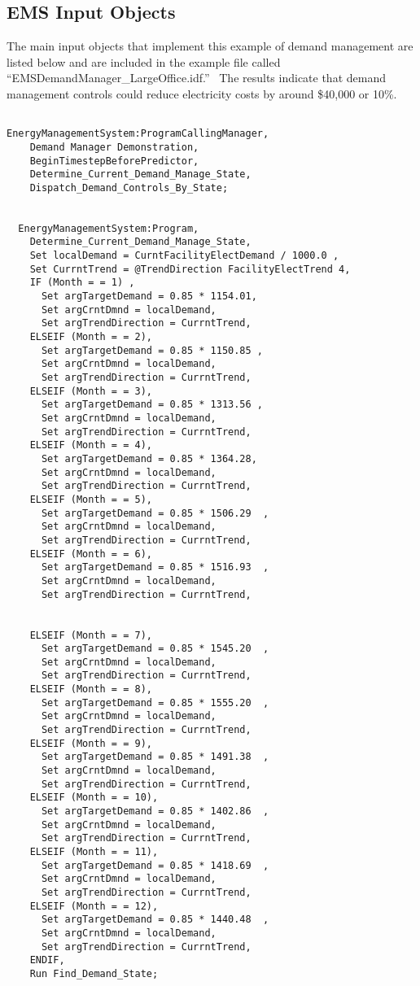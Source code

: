 \subsection{EMS Input Objects}\label{ems-input-objects-011}

The main input objects that implement this example of demand management are listed below and are included in the example file called ``EMSDemandManager\_LargeOffice.idf.''~ The results indicate that demand management controls could reduce electricity costs by around \$40,000 or 10\%.

\begin{lstlisting}

EnergyManagementSystem:ProgramCallingManager,
    Demand Manager Demonstration,
    BeginTimestepBeforePredictor,
    Determine_Current_Demand_Manage_State,
    Dispatch_Demand_Controls_By_State;


  EnergyManagementSystem:Program,
    Determine_Current_Demand_Manage_State,
    Set localDemand = CurntFacilityElectDemand / 1000.0 ,
    Set CurrntTrend = @TrendDirection FacilityElectTrend 4,
    IF (Month = = 1) ,
      Set argTargetDemand = 0.85 * 1154.01,
      Set argCrntDmnd = localDemand,
      Set argTrendDirection = CurrntTrend,
    ELSEIF (Month = = 2),
      Set argTargetDemand = 0.85 * 1150.85 ,
      Set argCrntDmnd = localDemand,
      Set argTrendDirection = CurrntTrend,
    ELSEIF (Month = = 3),
      Set argTargetDemand = 0.85 * 1313.56 ,
      Set argCrntDmnd = localDemand,
      Set argTrendDirection = CurrntTrend,
    ELSEIF (Month = = 4),
      Set argTargetDemand = 0.85 * 1364.28,
      Set argCrntDmnd = localDemand,
      Set argTrendDirection = CurrntTrend,
    ELSEIF (Month = = 5),
      Set argTargetDemand = 0.85 * 1506.29  ,
      Set argCrntDmnd = localDemand,
      Set argTrendDirection = CurrntTrend,
    ELSEIF (Month = = 6),
      Set argTargetDemand = 0.85 * 1516.93  ,
      Set argCrntDmnd = localDemand,
      Set argTrendDirection = CurrntTrend,


    ELSEIF (Month = = 7),
      Set argTargetDemand = 0.85 * 1545.20  ,
      Set argCrntDmnd = localDemand,
      Set argTrendDirection = CurrntTrend,
    ELSEIF (Month = = 8),
      Set argTargetDemand = 0.85 * 1555.20  ,
      Set argCrntDmnd = localDemand,
      Set argTrendDirection = CurrntTrend,
    ELSEIF (Month = = 9),
      Set argTargetDemand = 0.85 * 1491.38  ,
      Set argCrntDmnd = localDemand,
      Set argTrendDirection = CurrntTrend,
    ELSEIF (Month = = 10),
      Set argTargetDemand = 0.85 * 1402.86  ,
      Set argCrntDmnd = localDemand,
      Set argTrendDirection = CurrntTrend,
    ELSEIF (Month = = 11),
      Set argTargetDemand = 0.85 * 1418.69  ,
      Set argCrntDmnd = localDemand,
      Set argTrendDirection = CurrntTrend,
    ELSEIF (Month = = 12),
      Set argTargetDemand = 0.85 * 1440.48  ,
      Set argCrntDmnd = localDemand,
      Set argTrendDirection = CurrntTrend,
    ENDIF,
    Run Find_Demand_State;





\end{lstlisting}
